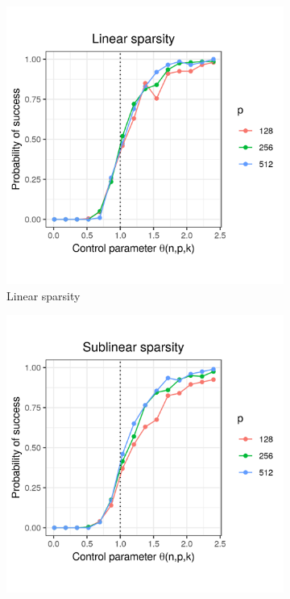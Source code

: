 \documentclass[letterpaper,12pt]{article}
\begin{document}
\begin{figure}[h]
  \centering
  \begin{subfigure}{0.32\textwidth}
    \includegraphics[width=0.9\linewidth]{uniform_linear_sparsity_alpha_1}
    \caption{Linear sparsity}
    \label{fig:uniform_linear_sparsity_alpha_1}
  \end{subfigure}
  \begin{subfigure}{0.32\textwidth}
    \includegraphics[width=0.9\linewidth]{uniform_sublinear_sparsity_alpha_1}

\end{subfigure}
\end{figure}
\end{document}
